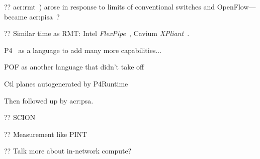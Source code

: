 ?? \gls{acr:rmt}~\parencite{DBLP:conf/sigcomm/BosshartGKVMIMH13}) arose in response to limits of conventional switches and OpenFlow---became \gls{acr:pisa}~\parencite{barefoot-pisa}?

?? Similar time as RMT: Intel \emph{FlexPipe}~\parencite{flexpipe-fm5000}, Cavium \emph{XPliant}~\parencite{cavium-xpliant}.

P4~\parencite{DBLP:journals/ccr/BosshartDGIMRSTVVW14} as a language to add many more capabilities...

POF as another language that didn't take off~\parencite{DBLP:conf/sigcomm/Song13}

Ctl planes autogenerated by P4Runtime~\parencite{p4-runtime}

Then followed up by  \gls{acr:psa}\parencite{p4-psa}.

?? SCION~\parencite{DBLP:conf/conext/RuiterS21}

?? Measurement like PINT~\parencite{DBLP:conf/sigcomm/BasatRLAYM20}

?? Talk more about in-network compute?

